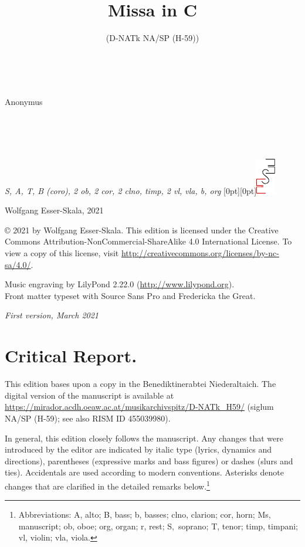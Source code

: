 \documentclass[parskip=full]{scrreprt}
\makeatletter
\DeclareRobustCommand{\sbseries}{\fontseries{sb}\selectfont}
\newcommand\fancytitlehead{
	\headingfont%
	\fontsize{80}{80}\selectfont\textcolor{black!80}{\@ifundefined{@shortname}{\@lastname}{\@shortname}.}\\[15pt]%
	\fontsize{60}{60}\selectfont\@ifundefined{@shorttitle}{\@title}{\@shorttitle}.%
}
\def\lastname#1{\def\@lastname{#1}}
\def\instrumentation#1{\def\@instrumentation{#1}}
\def\maketitle{%
\begin{titlepage}%
	\Large%
	{\@titlehead}%
	\vfill%
	{\strut\@firstname}\\%
	{\sbseries\color{oldred}\strut\@lastname}\\%
	{\strut\@namesuffix}%
	\vfill%
	{\sbseries\@title}\\%
	{\@subtitle}\\[\baselineskip]%
	{\itshape\@instrumentation}%
	\vfill%
	{\itshape\@parts}\hspace*{\fill}\raisebox{0pt}[0pt][0pt]{\includegraphics{ees_logo}}%
\end{titlepage}%
}
\newif\ifprintreport\printreportfalse
\makeatother
\begin{document}
\frenchspacing

\titlehead{\fancytitlehead}
\lastname{Anonymus}
\title{Missa in C}
\subtitle{(D-NATk NA/SP (H-59))}
\instrumentation{S, A, T, B (coro), 2 ob, 2 cor, 2 clno, timp, 2 vl, vla, b, org}
\maketitle


\thispagestyle{empty}

\vspace*{\fill}

\hspace*{1em}Wolfgang Esser-Skala, 2021

© 2021 by Wolfgang Esser-Skala. This edition is licensed under the Creative Commons Attribution-NonCommercial-ShareAlike 4.0 International License. To view a copy of this license, visit \url{http://creativecommons.org/licenses/by-nc-sa/4.0/}. 

Music engraving by LilyPond 2.22.0 (\url{http://www.lilypond.org}).\\
Front matter typeset with Source Sans Pro and Fredericka the Great.

\textit{First version, March 2021}

\vspace*{2cm}

\ifprintreport
\chapter*{Critical Report.}

This edition bases upon a copy in the Benediktinerabtei Niederaltaich. The digital version of the manuscript is available at \url{https://mirador.acdh.oeaw.ac.at/musikarchivspitz/D-NATk_H59/} (siglum NA/SP (H-59); see also RISM ID 455039980).

In general, this edition closely follows the manuscript. Any changes that were introduced by the editor are indicated by italic type (lyrics, dynamics and directions), parentheses (expressive marks and bass figures) or dashes (slurs and ties). Accidentals are used according to modern conventions. Asterisks denote changes that are clarified in the detailed remarks below.\footnote{Abbreviations: A, alto; B, bass; b, basses; clno, clarion; cor, horn; Ms, manuscript; ob, oboe; org, organ; r, rest; S,~soprano; T, tenor; timp, timpani; vl, violin; vla, viola.}
\end{document}

